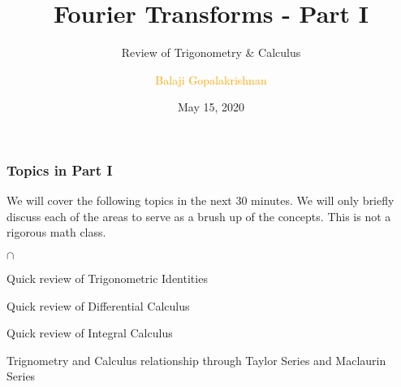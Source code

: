 \documentclass[10pt]{beamer}
\begin{document}
\author{\textcolor{orange}{Balaji Gopalakrishnan}}
\title{Fourier Transforms - Part I }
\subtitle{\huge Review of Trigonometry \& Calculus}

\date{May 15, 2020}


\begin{frame}[plain]
	\maketitle
\end{frame}

\begin{frame}
	\frametitle{Topics in Part I \hspace{25pt}} 
	We will cover the following topics in the next 30 minutes. We will only briefly discuss each of the areas to serve as a brush up of the concepts. This is not a rigorous math class. \\
	
\begin{list}{$\cap$}{}
	\item Quick review of Trigonometric Identities
	\item Quick review of Differential Calculus
	\item Quick review of Integral Calculus
	\item Trignometry and Calculus relationship through Taylor Series and Maclaurin Series
\end{list}
	
\end{frame}
\end{document}
